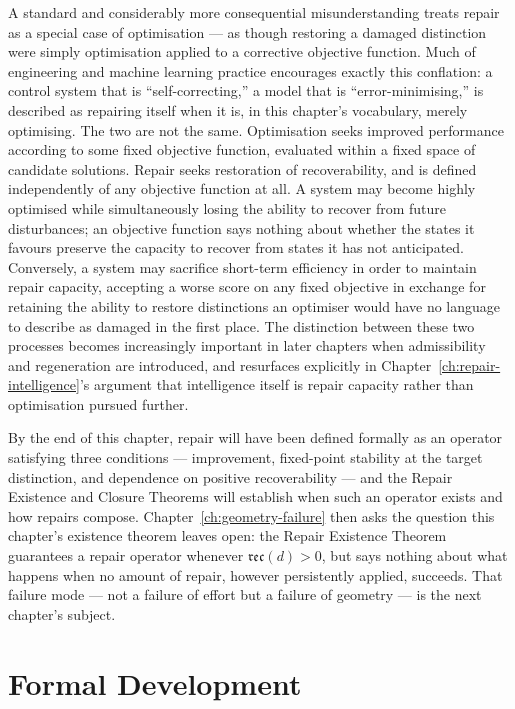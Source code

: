 \documentclass[12pt,twoside,openright]{book}
\newcommand{\reco}{\mathfrak{rec}}
\begin{document}
A standard and considerably more consequential
misunderstanding treats repair as a special case of
optimisation --- as though restoring a damaged distinction
were simply optimisation applied to a corrective objective
function. Much of engineering and machine learning practice
encourages exactly this conflation: a control system that
is ``self-correcting,'' a model that is ``error-minimising,''
is described as repairing itself when it is, in this
chapter's vocabulary, merely optimising. The two are not the
same. Optimisation seeks improved performance according to
some fixed objective function, evaluated within a fixed space
of candidate solutions. Repair seeks restoration of
recoverability, and is defined independently of any
objective function at all. A system may become highly
optimised while simultaneously losing the ability to recover
from future disturbances; an objective function says nothing
about whether the states it favours preserve the capacity to
recover from states it has not anticipated. Conversely, a
system may sacrifice short-term efficiency in order to
maintain repair capacity, accepting a worse score on any
fixed objective in exchange for retaining the ability to
restore distinctions an optimiser would have no language to
describe as damaged in the first place. The distinction
between these two processes becomes increasingly important
in later chapters when admissibility and regeneration are
introduced, and resurfaces explicitly in
Chapter~\ref{ch:repair-intelligence}'s argument that
intelligence itself is repair capacity rather than
optimisation pursued further.

By the end of this chapter, repair will have been defined
formally as an operator satisfying three conditions ---
improvement, fixed-point stability at the target
distinction, and dependence on positive recoverability ---
and the Repair Existence and Closure Theorems will establish
when such an operator exists and how repairs compose.
Chapter~\ref{ch:geometry-failure} then asks the question this
chapter's existence theorem leaves open: the Repair Existence
Theorem guarantees a repair operator whenever $\reco(d)>0$,
but says nothing about what happens when no amount of repair,
however persistently applied, succeeds. That failure mode ---
not a failure of effort but a failure of geometry --- is the
next chapter's subject.

\section{Formal Development}
\label{sec:ch7-formal}
\end{document}
